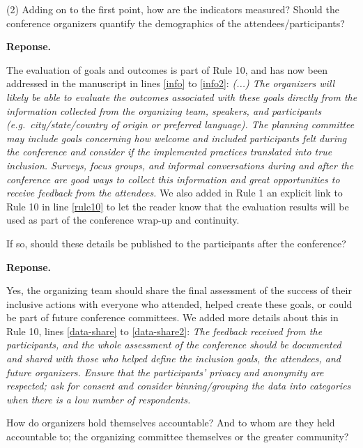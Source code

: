 \documentclass{article}
\newenvironment{Reply}{\noindent\color{BlueViolet}\textbf{Reponse.}}{\vspace{1em}}
\begin{document}
(2) Adding on to the first point, how are the indicators measured? Should the conference organizers quantify the demographics of the attendees/participants? 

\begin{Reply}

The evaluation of goals and outcomes is part of Rule 10, and has now been addressed in the manuscript in lines \ref{info} to \ref{info2}:
\textit{
(...) The organizers will likely be able to evaluate the outcomes associated with these goals directly from the information collected from the organizing team, speakers, and participants (e.g.\ city/state/country of origin or preferred language).
The planning committee may include goals concerning how welcome and included participants felt during the conference and consider if the implemented practices translated into true inclusion. 
Surveys, focus groups, and informal conversations during and after the conference are good ways to collect this information and great opportunities to receive feedback from the attendees.
}
We also added in Rule 1 an explicit link to Rule 10 in line \ref{rule10} to let the reader know that the evaluation results will be used as part of the conference wrap-up and continuity. 

\end{Reply}

If so, should these details be published to the participants after the conference? 

\begin{Reply}

Yes, the organizing team should share the final assessment of the success of their inclusive actions with everyone who attended, helped create these goals, or could be part of future conference committees. 
We added more details about this in Rule 10, lines \ref{data-share} to \ref{data-share2}:
\textit{The feedback received from the participants, and the whole assessment of the conference should be documented and shared with those who helped define the inclusion goals, the attendees, and future organizers. 
Ensure that the participants' privacy and anonymity are respected; ask for consent and consider binning/grouping the data into categories when there is a low number of respondents.}
\end{Reply}

How do organizers hold themselves accountable? And to whom are they held accountable to; the organizing committee themselves or the greater community?
\end{document}
